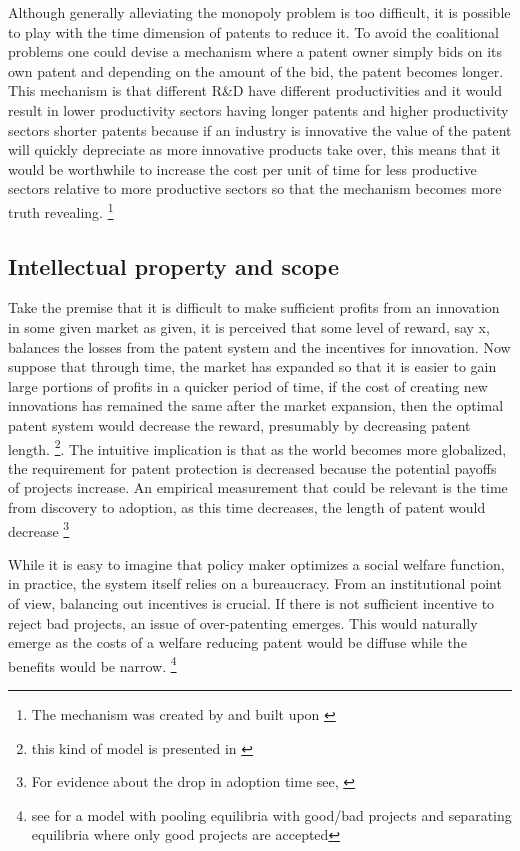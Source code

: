 \documentclass[12pt]{article}
\numberwithin{equation}{section}
\begin{document}

Although generally alleviating the monopoly problem is too difficult, it is possible to play with the time dimension of patents to reduce it. To avoid the coalitional problems one could devise a mechanism where a patent owner simply bids on its own patent and depending on the amount of the bid, the patent becomes longer. This mechanism is that different R\&D have different productivities and it would result in lower productivity sectors having longer patents and higher productivity sectors shorter patents because if an industry is innovative the value of the patent will quickly depreciate as more innovative products take over, this means that it would be worthwhile to increase the cost per unit of time for less productive sectors relative to more productive sectors so that the mechanism becomes more truth revealing.  \footnote{ The mechanism was created by \cite{Scotchmer1999} and built upon \cite{Cornelli1999}}


\subsection{Intellectual property and scope}

Take the premise that it is difficult to make sufficient profits from an innovation in some given market as given, it is perceived that some level of reward, say x, balances the losses from the patent system and the incentives for innovation. Now suppose that through time, the market has expanded so that it is easier to gain large portions of profits in a quicker period of time, if the cost of creating new innovations has remained the same after the market expansion, then the optimal patent system would decrease the reward, presumably by decreasing patent length. \footnote{this kind of model is presented in \cite{boldrin2009market} }. The intuitive implication is that as the world becomes more globalized, the requirement for patent protection is decreased because the potential payoffs of projects increase. An empirical measurement that could be relevant is the time from discovery to adoption, as this time decreases, the length of patent would decrease \footnote{For evidence about the drop in adoption time see, \cite{comin2006five}}

While it is easy to imagine that policy maker optimizes a social welfare function, in practice, the system itself relies on a bureaucracy. From an institutional point of view, balancing out incentives is crucial. If there is not sufficient incentive to reject bad projects, an issue of over-patenting emerges. This would naturally emerge as the costs of a welfare reducing patent would be diffuse while the benefits would be narrow. \footnote{see \cite{Caillaud2012} for a model with pooling equilibria with good/bad projects and separating equilibria where only good projects are accepted}
\end{document}
